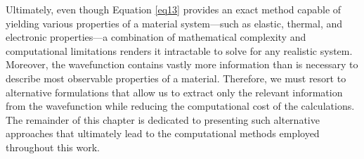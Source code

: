 Ultimately, even though Equation \ref{eq13} provides an exact method capable of yielding various properties of a material system---such as elastic, thermal, and electronic properties---a combination of mathematical complexity and computational limitations renders it intractable to solve for any realistic system. Moreover, the wavefunction contains vastly more information than is necessary to describe most observable properties of a material. Therefore, we must resort to alternative formulations that allow us to extract only the relevant information from the wavefunction while reducing the computational cost of the calculations. The remainder of this chapter is dedicated to presenting such alternative approaches that ultimately lead to the computational methods employed throughout this work.

